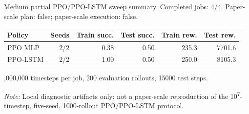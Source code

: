 Medium partial PPO/PPO-LSTM sweep summary. Completed jobs: 4/4. Paper-scale plan: false; paper-scale execution: false.
\begin{tabular}{lrrrrr}
\toprule
Policy & Seeds & Train succ. & Test succ. & Train rew. & Test rew. \\
\midrule
PPO MLP & 2/2 & 0.38 & 0.50 & 235.3 & 7701.6 \\
PPO-LSTM & 2/2 & 1.00 & 0.50 & 250.0 & 8105.3 \\
\bottomrule
\end{tabular}
\par\smallskip{},000,000 timesteps per job, 200 evaluation rollouts, 15000 test steps.
\par\smallskip\noindent\emph{Note:} Local diagnostic artifacts only; not a paper-scale reproduction of the 10\textsuperscript{7}-timestep, five-seed, 1000-rollout PPO/PPO-LSTM protocol.
